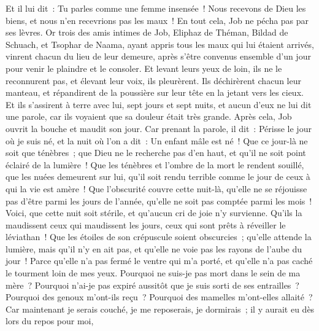 \begin{multicols}{2}
Et il lui dit~: Tu parles comme une femme insensée~! Nous recevons de Dieu les biens, et nous n'en recevrions pas les maux~! En tout cela, Job ne pécha pas par ses lèvres.
Or trois des amis intimes de Job, Eliphaz de Théman, Bildad de Schuach, et Tsophar de Naama, ayant appris tous les maux qui lui étaient arrivés, vinrent chacun du lieu de leur demeure, après s'être convenus ensemble d'un jour pour venir le plaindre et le consoler.
Et levant leurs yeux de loin, ils ne le reconnurent pas, et élevant leur voix, ils pleurèrent. Ils déchirèrent chacun leur manteau, et répandirent de la poussière sur leur tête en la jetant vers les cieux.
Et ils s'assirent à terre avec lui, sept jours et sept nuits, et aucun d'eux ne lui dit une parole, car ils voyaient que sa douleur était très grande.
\VerseOne{}Après cela, Job ouvrit la bouche et maudit son jour.
Car prenant la parole, il dit~:
Périsse le jour où je suis né, et la nuit où l'on a dit~: Un enfant mâle est né~!
Que ce jour-là ne soit que ténèbres~; que Dieu ne le recherche pas d'en haut, et qu'il ne soit point éclairé de la lumière~! 
Que les ténèbres et l'ombre de la mort le rendent souillé, que les nuées demeurent sur lui, qu'il soit rendu terrible comme le jour de ceux à qui la vie est amère~! 
Que l'obscurité couvre cette nuit-là, qu'elle ne se réjouisse pas d'être parmi les jours de l'année, qu'elle ne soit pas comptée parmi les mois~!
Voici, que cette nuit soit stérile, et qu'aucun cri de joie n'y survienne.
Qu'ils la maudissent ceux qui maudissent les jours, ceux qui sont prêts à réveiller le léviathan~!
Que les étoiles de son crépuscule soient obscurcies~; qu'elle attende la lumière, mais qu'il n'y en ait pas, et qu'elle ne voie pas les rayons de l'aube du jour~!
Parce qu'elle n'a pas fermé le ventre qui m'a porté, et qu'elle n'a pas caché le tourment loin de mes yeux.
Pourquoi ne suis-je pas mort dans le sein de ma mère~? Pourquoi n'ai-je pas expiré aussitôt que je suis sorti de ses entrailles~?
Pourquoi des genoux m'ont-ils reçu~? Pourquoi des mamelles m'ont-elles allaité~?
Car maintenant je serais couché, je me reposerais, je dormirais~; il y aurait eu dès lors du repos pour moi,

\end{multicols}
